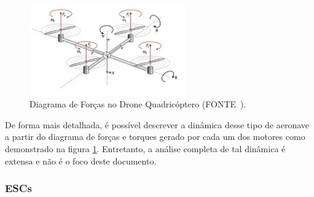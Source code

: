 \documentclass[12pt,a4paper,oneside]{book}
\begin{document}
%
\begin{figure}[H]
  \centering
  \includegraphics[width=0.6\textwidth]{Images/introducao/force_diagram_drone.png}
  \caption{Diagrama de Forças no Drone Quadricóptero (FONTE~\cite{url:drone_forces_diagram}).}
  \label{fig:force_diagram_drone.png.0}
\end{figure}
%
De forma mais detalhada, é possível descrever a dinâmica desse tipo de aeronave a partir do diagrama de forças e torques gerado por cada um dos motores como demonstrado na figura \ref{fig:force_diagram_drone.png.0}. Entretanto, a análise completa de tal dinâmica é extensa e não é o foco deste documento.  

\subsubsection*{ESCs}
\end{document}
